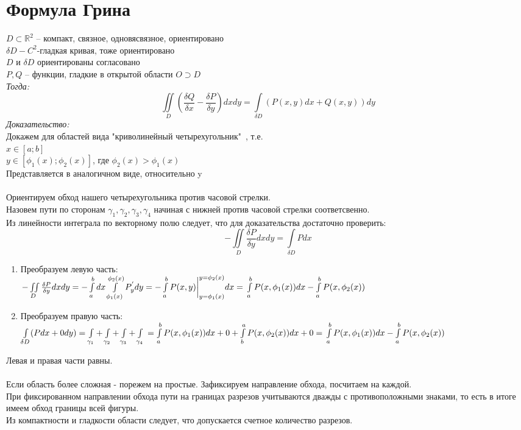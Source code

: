 \documentclass[paper=a4, fontsize=17pt]{article}
\begin{document}
\section{Формула Грина}
$D \subset \mathds{R}^2$ -- компакт, связное, одновясвязное, ориентировано\\$\delta D-C^2\text{-гладкая кривая, тоже ориентировано}$\\
$D$ и $\delta D$ ориентированы согласовано \\
$P, Q$ -- функции, гладкие в открытой области $O \supset D$ \\
\emph{Тогда:} $$\iint\limits_{D}(\frac{\delta Q}{\delta x} - \frac{\delta P}{\delta y})dxdy = \int\limits_{\delta D}(P(x,y)dx + Q(x,y))dy$$
\emph{Доказательство:} \\
Докажем для областей вида "криволинейный четырехугольник"\ , т.е. \\
$x \in [a;b]$ \\
$y \in [\phi_1(x);\phi_2(x)]$, где $\phi_2(x) > \phi_1(x)$ \\
Представляется в аналогичном виде, относительно y \\\\
Ориентируем обход нашего четырехугольника против часовой стрелки.\\
Назовем пути по сторонам $\gamma_1, \gamma_2, \gamma_3, \gamma_4$ начиная с нижней против часовой стрелки соответсвенно. \\
Из линейности интеграла по векторному полю следует, что для доказательства достаточно проверить: $$-\iint\limits_{D} \frac{\delta P}{\delta y}dxdy = \int\limits_{\delta D}Pdx$$
\begin{enumerate}
	\item Преобразуем левую часть:\\
		$-\iint\limits_{D} \frac{\delta P}{\delta y}dxdy = - \int\limits_{a}^bdx\int\limits_{\phi_1(x)}^{\phi_2(x)}P^{'}_ydy = -\int\limits_{a}^bP(x,y)\bigg|_{y=\phi_1(x)}^{y=\phi_2(x)}dx =\\ \int\limits_{a}^bP(x,\phi_1(x))dx - \int\limits_{a}^bP(x,\phi_2(x))$
	\item Преобразуем правую часть: \\
		$\int\limits_{\delta D}(Pdx + 0dy) = \int\limits_{\gamma_1}+\int\limits_{\gamma_2}+\int\limits_{\gamma_3}+\int\limits_{\gamma_4} \\ = \int\limits_{a}^bP(x,\phi_1(x))dx + 0 + \int\limits_{b}^aP(x, \phi_2(x))dx + 0 = \\ \int\limits_{a}^bP(x,\phi_1(x))dx - \int\limits_{a}^bP(x,\phi_2(x))$
\end{enumerate}
Левая и правая части равны. \\\\
Если область более сложная - порежем на простые. Зафиксируем направление обхода, посчитаем на каждой. \\
При фиксированном направлении обхода пути на границах разрезов учитываются дважды с противоположными знаками, то есть в итоге имеем обход границы всей фигуры.\\
Из компактности и гладкости области следует, что допускается счетное количество разрезов.
\end{document}
